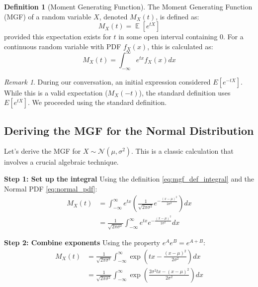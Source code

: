 \documentclass[11pt, letterpaper]{article}
\theoremstyle{definition}
\newtheorem{definition}[theorem]{Definition}
\theoremstyle{remark}
\newtheorem{remark}[theorem]{Remark}
\DeclareMathOperator{\E}{\mathbb{E}} %
\begin{document}
\begin{definition}[Moment Generating Function]
The Moment Generating Function (MGF) of a random variable $X$, denoted $M_X(t)$, is defined as:
\begin{equation}
    M_X(t) = \E\left[e^{tX}\right]
\end{equation}
provided this expectation exists for $t$ in some open interval containing $0$. For a continuous random variable with PDF $f_X(x)$, this is calculated as:
\begin{equation}
    M_X(t) = \int_{-\infty}^{\infty} e^{tx} f_X(x) dx
    \label{eq:mgf_def_integral}
\end{equation}
\end{definition}

\begin{remark}
During our conversation, an initial expression considered $E[e^{-tX}]$. While this is a valid expectation ($M_X(-t)$), the standard definition uses $E[e^{tX}]$. We proceeded using the standard definition.
\end{remark}

\subsection{Deriving the MGF for the Normal Distribution}

Let's derive the MGF for $X \sim \mathcal{N}(\mu, \sigma^2)$. This is a classic calculation that involves a crucial algebraic technique.

\textbf{Step 1: Set up the integral}
Using the definition \eqref{eq:mgf_def_integral} and the Normal PDF \eqref{eq:normal_pdf}:
\begin{align*}
    M_X(t) &= \int_{-\infty}^{\infty} e^{tx} \left( \frac{1}{\sqrt{2 \pi \sigma^2}} e^{-\frac{(x-\mu)^2}{2 \sigma^2}} \right) dx \\
           &= \frac{1}{\sqrt{2 \pi \sigma^2}} \int_{-\infty}^{\infty} e^{tx} e^{-\frac{(x-\mu)^2}{2 \sigma^2}} dx 
\end{align*}

\textbf{Step 2: Combine exponents}
Using the property $e^A e^B = e^{A+B}$:
\begin{align*}
    M_X(t) &= \frac{1}{\sqrt{2 \pi \sigma^2}} \int_{-\infty}^{\infty} \exp\left( tx - \frac{(x-\mu)^2}{2 \sigma^2} \right) dx \\
           &= \frac{1}{\sqrt{2 \pi \sigma^2}} \int_{-\infty}^{\infty} \exp\left( \frac{2\sigma^2 tx - (x-\mu)^2}{2 \sigma^2} \right) dx 
\end{align*}
\end{document}
